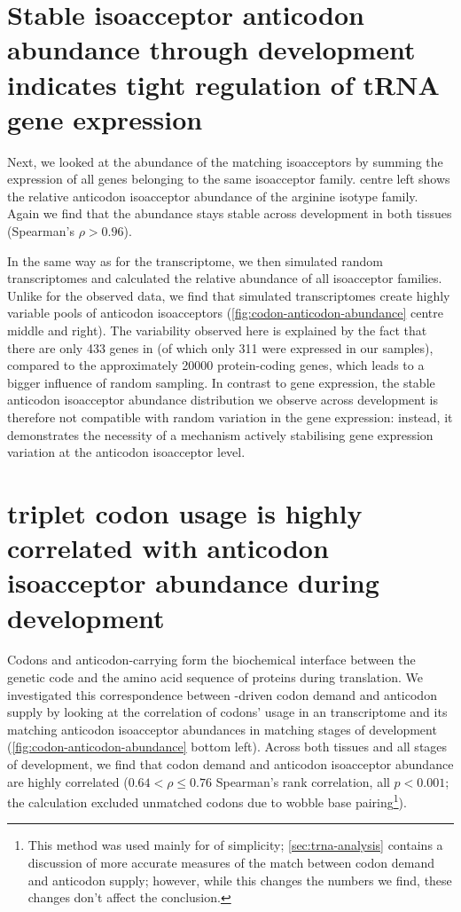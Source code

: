 \section{Stable isoacceptor anticodon abundance through development indicates
tight regulation of tRNA gene expression}

Next, we looked at the abundance of the matching \trna isoacceptors by summing
the expression of all \trna genes belonging to the same isoacceptor family.
 centre left shows the relative anticodon
isoacceptor abundance of the arginine isotype family. Again we find that the
abundance stays stable across development in both tissues (Spearman’s \(\rho >
0.96\)).

In the same way as for the \mrna transcriptome, we then simulated random \trna
transcriptomes and calculated the relative abundance of all isoacceptor
families. Unlike for the observed \trna data, we find that simulated \trna
transcriptomes create highly variable pools of anticodon isoacceptors
(\cref{fig:codon-anticodon-abundance} centre middle and right). The variability
observed here is explained by the fact that there are only \num{433} \trna genes
in \mmu (of which only \num{311} were expressed in our samples), compared to the
approximately \num{20000} protein-coding genes, which leads to a bigger
influence of random sampling. In contrast to \mrna gene expression, the stable
anticodon isoacceptor abundance distribution we observe across development is
therefore not compatible with random variation in the \trna gene expression:
instead, it demonstrates the necessity of a mechanism actively stabilising \trna
gene expression variation at the anticodon isoacceptor level.

\section{\mrna triplet codon usage is highly correlated with \trna anticodon
isoacceptor abundance during development}

Codons and anticodon-carrying \trna[s] form the biochemical interface between
the genetic code and the amino acid sequence of proteins during \mrna
translation. We investigated this correspondence between \mrna-driven codon
demand and \trna anticodon supply by looking at the correlation of codons’ usage
in an \mrna transcriptome and its matching \trna anticodon isoacceptor
abundances in matching stages of development
(\cref{fig:codon-anticodon-abundance} bottom left). Across both tissues and all
stages of development, we find that \mrna codon demand and \trna anticodon
isoacceptor abundance are highly correlated (\(0.64 < \rho \leq 0.76\)
Spearman’s rank correlation, all \(p < 0.001\); the calculation excluded
unmatched \mrna codons due to wobble base pairing\footnote{This method was used
mainly for of simplicity; \cref{sec:trna-analysis} contains a discussion of more
accurate measures of the match between codon demand and \trna anticodon supply;
however, while this changes the numbers we find, these changes don’t affect the
conclusion.}).

